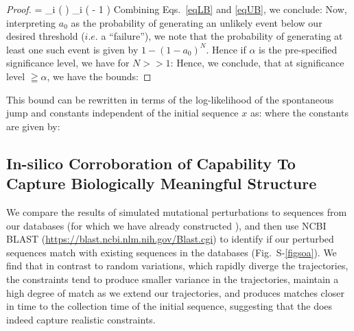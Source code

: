 {\begin{proof}
{  = \sum_i \log  \left  (    \right ) \leqq \sum_i \left  (  - 1 \right ) \leqq {}\theta
}%
Combining Eqs.~\ref{eqLB} and \ref{eqUB}, we conclude:
%
Now, interpreting $a_0$ as the probability of generating an unlikely event below our desired threshold ($i.e.$ a ``failure''), we note that the probability of generating at least one such event is given by $1-(1-a_0)^N$. Hence if $\alpha$ is the pre-specified significance level, we have for $N >> 1 $:
%
Hence, we conclude, that at significance level $\geqq \alpha$, we have the bounds:
%
\end{proof}
\begin{rem}
This bound can be rewritten in terms of the log-likelihood of the spontaneous jump and  constants independent of the  initial sequence $x$ as:
%
where the constants are given by:
%
\end{rem}


\subsection*{In-silico Corroboration of  Capability To Capture Biologically Meaningful Structure}
We compare the results of simulated mutational perturbations to sequences from our databases (for which we have already constructed ), and then use NCBI BLAST (\href{https://blast.ncbi.nlm.nih.gov/Blast.cgi}{https://blast.ncbi.nlm.nih.gov/Blast.cgi}) to identify  if  our perturbed sequences match with existing sequences in the databases (\SUPPLEMENTARY Fig.~S-\ref{figsoa}). We find that in contrast to random variations, which rapidly diverge the trajectories, the \enet constraints tend to produce smaller variance in the trajectories, maintain a high degree of match as we extend our trajectories, and produces matches closer in time to the collection time of the  initial sequence, suggesting that the \enet  does indeed capture realistic constraints.


}
